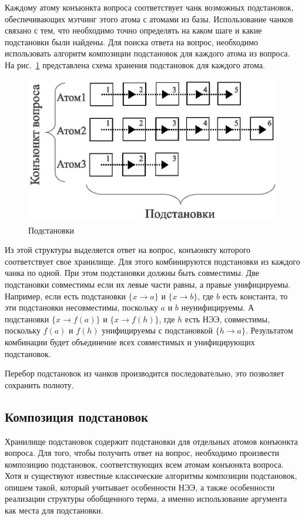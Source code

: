 Каждому атому конъюнкта вопроса соответствует чанк возможных подстановок, обеспечивающих мэтчинг этого атома с атомами из базы. Использование чанков связано с тем, что необходимо точно определять на каком шаге и какие подстановки были найдены. Для поиска ответа на вопрос, необходимо использовать алгоритм композиции подстановок для каждого атома из вопроса. На рис.~\ref{fig:anbase} представлена схема хранения подстановок для каждого атома.
\begin{figure}[h]
  \centering
  \includegraphics[width=0.7\linewidth]{pics/AnBase.eps}
  \caption{Подстановки}
  \label{fig:anbase}
\end{figure}

Из этой структуры выделяется ответ на вопрос, конъюнкту которого соответствует свое хранилище. Для этого комбинируются подстановки из каждого чанка по одной. При этом подстановки должны быть совместимы. Две подстановки совместимы если их левые части равны, а правые унифицируемы. Например, если есть подстановки $\{x \rightarrow a\}$ и $\{x \rightarrow b\}$, где $b$ есть константа, то эти подстановки несовместимы, поскольку $a$ и $b$ неунифицируемы. А подстановки $\{x \rightarrow f(a)\}$ и $\{x \rightarrow f(h)\}$, где $h$ есть НЭЭ, совместимы, поскольку $f(a)$ и $f(h)$ унифицируемы с подстановкой $\{h \rightarrow a\}$. Результатом комбинации будет объединение всех совместимых и унифицирующих подстановок.

Перебор подстановок из чанков производится последовательно, это позволяет сохранить полноту.


\subsection{Композиция подстановок}

Хранилище подстановок содержит подстановки для отдельных атомов конъюнкта вопроса. Для того, чтобы получить ответ на вопрос, необходимо произвести композицию подстановок, соответствующих всем атомам конъюнкта вопроса. Хотя и существуют известные классические алгоритмы композиции подстановок, опишем такой, который учитывает особенности НЭЭ, а также особенности реализации структуры обобщенного терма, а именно использование аргумента как места для подстановки.

